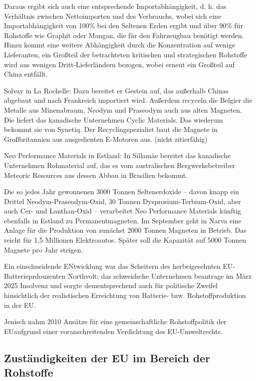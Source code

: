 \documentclass[12pt,a4paper,oneside]{book} %
\begin{document}
Daraus ergibt sich auch eine entsprechende Importabhängigkeit, d. h. das Verhältnis zwischen Nettoimporten und des Verbrauchs, wobei sich eine Importabhängigkeit von 100\% bei den Seltenen Erden ergibt und über 90\% für Rohstoffe wie Graphit oder Mangan, die für den Fahrzeugbau benötigt werden.\autocite{PE 785.676, S. 4-5} Hinzu kommt eine weitere Abhängigkeit durch die Konzentration auf wenige Lieferanten, ein Großteil der betrachteten kritischen und strategischen Rohstoffe wird aus wenigen Dritt-Lieferländern bezogen, wobei erneut ein Großteil auf China entfällt.\autocite{PE 785.676, S. 6-7}

Solvay in La Rochelle: Dazu bereitet er Gestein auf, das außerhalb Chinas abgebaut und nach Frankreich importiert wird. Außerdem recyceln die Belgier die Metalle aus Minenabraum, Neodym und Praseodym auch aus alten Magneten. Die liefert das kanadische Unternehmen Cyclic Materials. Das wiederum bekommt sie von Synetiq. Der Recyclingspezialist baut die Magnete in Großbritannien aus ausgedienten E-Motoren aus. (nicht zitierfähig)

Neo Performance Materials in Estland: In Sillamäe bereitet das kanadische Unternehmen Rohmaterial auf, das es vom australischen Bergwerksbetreiber Meteoric Resources aus dessen Abbau in Brasilien bekommt.

Die so jedes Jahr gewonnenen 3000 Tonnen Seltenerdoxide – davon knapp ein Drittel Neodym-Praseodym-Oxid, 30 Tonnen Dysprosium-Terbium-Oxid, aber auch Cer- und Lanthan-Oxid – verarbeitet Neo Performance Materials künftig ebenfalls in Estland zu Permanentmagneten. Im September geht in Narva eine Anlage für die Produktion von zunächst 2000 Tonnen Magneten in Betrieb. Das reicht für 1,5 Millionen Elektroautos. Später soll die Kapazität auf 5000 Tonnen Magnete pro Jahr steigen.

Ein einschneidende ENtwicklung war das Scheitern des herbeigesehnten EU-Batterieprdouzenten Northvolt; das schweidsche Unternehmen beantrage im März 2025 Insolvenz und sorgte dementsprechend auch für politische Zweifel hinsichtlich der realistischen Erreichtung von Batterie- bzw. Rohstoffproduktion in der EU.\autocite{https://www.ft.com/content/63b16b6a-e143-4e2c-ac27-5d3f7a89a41f?syn-25a6b1a6=1}

Jenisch nahm 2010 \glqq Ansätze für eine gemeinschaftliche Rohstoffpolitik der EU\glqq aufgrund einer voranschreitenden Verdichtung des EU-Umweltrechts.\autocite{Jenisch II, S. 433}
	
\subsection{Zuständigkeiten der EU im Bereich der Rohstoffe}
\end{document}

